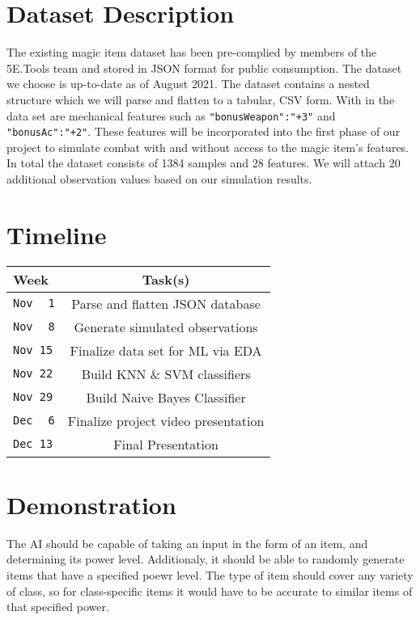 \documentclass[12pt]{diazessay}
\begin{document}
\section*{Dataset Description}

The existing magic item dataset \cite{Mirror5eTools} has been pre-complied by members of the 5E.Tools team and stored in JSON format for public consumption.
The dataset we choose is up-to-date as of August 2021.
The dataset contains a nested structure which we will parse and flatten to a tabular, CSV form.
With in the data set are mechanical features such as \texttt{"bonusWeapon":"+3"} and \texttt{"bonusAc":"+2"}.
These features will be incorporated into the first phase of our project to simulate combat with and without access to the magic item's features.
In total the dataset consists of 1384 samples and 28 features.
We will attach 20 additional observation values based on our simulation results.


\section*{Timeline}


\begin{tabular}{ |l|c| }
	\hline
	Week & Task(s) \\ \hline
	\texttt{Nov $\,$ 1} & Parse and flatten JSON database  \\
	\texttt{Nov $\,$ 8} & Generate simulated observations  \\
	\texttt{Nov     15} & Finalize data set for ML via EDA \\
	\texttt{Nov     22} & Build KNN \& SVM classifiers \\
	\texttt{Nov     29} & Build Naive Bayes Classifier \\
	\texttt{Dec $\,$ 6} & Finalize project video presentation \\
	\texttt{Dec     13} & Final Presentation \\
	\hline
\end{tabular}


\section*{Demonstration}

The AI should be capable of taking an input in the form of an item, and determining its power level. Additionaly, it should be able to randomly generate items that have a specified poewr level. The type of item should cover any variety of class, so for class-specific items it would have to be accurate to similar items of that specified power.
\end{document}
